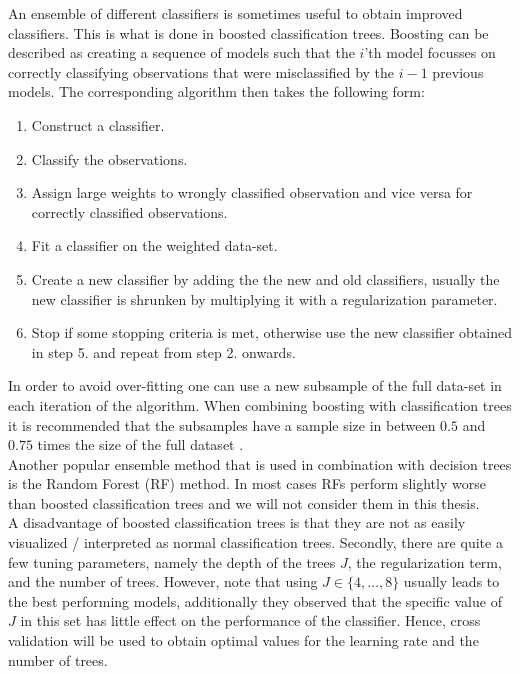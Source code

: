 An ensemble of different classifiers is sometimes useful to obtain improved classifiers. This is what is done in boosted classification trees. Boosting can be described as creating a sequence of models such that the $i$'th model focusses on correctly classifying observations that were misclassified by the $i-1$ previous models. The corresponding algorithm then takes the following form:\\
\begin{enumerate}
\item Construct a classifier.
\item Classify the observations.
\item Assign large weights to wrongly classified observation and vice versa for correctly classified observations. 
\item Fit a classifier on the weighted data-set.
\item Create a new classifier by adding the the new and old classifiers, usually the new classifier is shrunken by multiplying it with a regularization parameter.
\item Stop if some stopping criteria is met, otherwise use the new classifier obtained in step 5. and repeat from step 2. onwards.
\end{enumerate}

In order to avoid over-fitting one can use a new subsample of the full data-set in each iteration of the algorithm. When combining boosting with classification trees it is recommended that the subsamples have a sample size in between $0.5$ and $0.75$ times the size of the full dataset \parencite{elith_working_2008}.\\

Another popular ensemble method that is used in combination with decision trees is the Random Forest (RF) method. In most cases RFs perform slightly worse than boosted classification trees \parencite{hastie_elements_2009} and we will not consider them in this thesis.\\

A disadvantage of boosted classification trees is that they are not as easily visualized / interpreted as normal classification trees. Secondly, there are quite a few tuning parameters, namely the depth of the trees $J$, the regularization term, and the number of trees. However, \cite{hastie_elements_2009} note that using $J \in \{4,\dots,8\}$ usually leads to the best performing models, additionally they observed that the specific value of $J$ in this set has little effect on the performance of the classifier. Hence, cross validation will be used to obtain optimal values for the learning rate and the number of trees.\\

